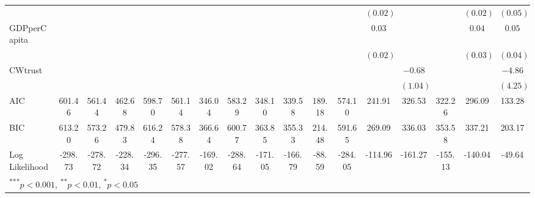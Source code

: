 \documentclass[a4paper]{article}\usepackage{graphicx, color}
\begin{document}
\begin{landscape}
\begin{table}
{{\begin{tabular}{l c c c c c c c c c c c c c c c c }
                    &               &               &               &               &               &               &               &               &               &          &               & $(0.02)$ &          &              & $(0.02)$    & $(0.05)$            \\
GDPperCapita        &               &               &               &               &               &               &               &               &               &          &               & $0.03$   &          &              & $0.04$      & $0.05$              \\
                    &               &               &               &               &               &               &               &               &               &          &               & $(0.02)$ &          &              & $(0.03)$    & $(0.04)$            \\
CWtrust             &               &               &               &               &               &               &               &               &               &          &               &          & $-0.68$  &              &             & $-4.86$             \\
                    &               &               &               &               &               &               &               &               &               &          &               &          & $(1.04)$ &              &             & $(4.25)$            \\
\hline
AIC                 & 601.46        & 561.44        & 462.68        & 598.70        & 561.14        & 346.04        & 583.29        & 348.10        & 339.58        & 189.18   & 574.10        & 241.91   & 326.53   & 322.26       & 296.09      & 133.28              \\
BIC                 & 613.20        & 573.26        & 479.83        & 616.24        & 578.38        & 366.64        & 600.77        & 363.85        & 355.33        & 214.48   & 591.65        & 269.09   & 336.03   & 353.58       & 337.21      & 203.17              \\
Log Likelihood      & -298.73       & -278.72       & -228.34       & -296.35       & -277.57       & -169.02       & -288.64       & -171.05       & -166.79       & -88.59   & -284.05       & -114.96  & -161.27  & -155.13      & -140.04     & -49.64              \\
\hline
\multicolumn{17}{l}{\scriptsize{\textsuperscript{***}$p<0.001$, 
  \textsuperscript{**}$p<0.01$, 
  \textsuperscript{*}$p<0.05$}}
\end{tabular}


}}
\end{table}
\end{landscape}
\end{document}
